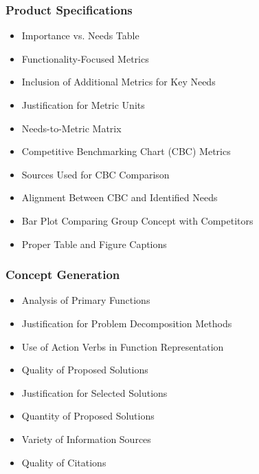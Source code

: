 \subsubsection{Product Specifications}
\begin{itemize}
    \item Importance vs. Needs Table
    \item Functionality-Focused Metrics
    \item Inclusion of Additional Metrics for Key Needs
    \item Justification for Metric Units
    \item Needs-to-Metric Matrix
    \item Competitive Benchmarking Chart (CBC) Metrics
    \item Sources Used for CBC Comparison
    \item Alignment Between CBC and Identified Needs
    \item Bar Plot Comparing Group Concept with Competitors
    \item Proper Table and Figure Captions
\end{itemize}

\subsubsection{Concept Generation}
\begin{itemize}
    \item Analysis of Primary Functions
    \item Justification for Problem Decomposition Methods
    \item Use of Action Verbs in Function Representation
    \item Quality of Proposed Solutions
    \item Justification for Selected Solutions
    \item Quantity of Proposed Solutions
    \item Variety of Information Sources
    \item Quality of Citations
\end{itemize}




